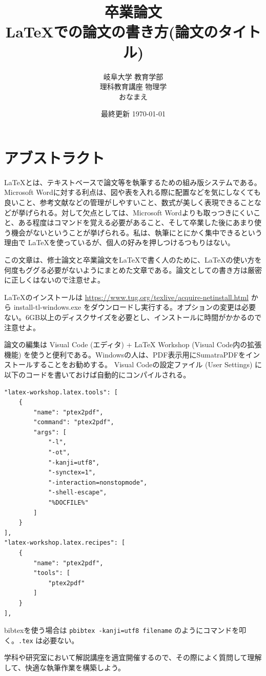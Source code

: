 \documentclass[a4j]{jsarticle}
\title{\vspace{60mm} \LARGE 卒業論文\vspace{10mm}\\LaTeXでの論文の書き方(論文のタイトル)}
\author{\Large 岐阜大学 教育学部 \\ \vspace{5mm}
\Large 理科教育講座 物理学 \\ \vspace{5mm}
\LARGE おなまえ}
\date{最終更新 \today}
\begin{document}
\maketitle
\thispagestyle{empty} %
\newpage %
\tableofcontents %
\newpage %
\section*{アブストラクト}

\LaTeX とは、テキストベースで論文等を執筆するための組み版システムである。Microsoft Wordに対する利点は、図や表を入れる際に配置などを気にしなくても良いこと、参考文献などの管理がしやすいこと、数式が美しく表現できることなどが挙げられる。対して欠点としては、Microsoft Wordよりも取っつきにくいこと、ある程度はコマンドを覚える必要があること、そして卒業した後にあまり使う機会がないということが挙げられる。私は、執筆にとにかく集中できるという理由で \LaTeX を使っているが、個人の好みを押しつけるつもりはない。

この文章は、修士論文と卒業論文を\LaTeX で書く人のために、\LaTeX の使い方を何度もググる必要がないようにまとめた文章である。論文としての書き方は厳密に正しくはないので注意せよ。

\LaTeX のインストールは \url{https://www.tug.org/texlive/acquire-netinstall.html} から install-tl-windows.exe をダウンロードし実行する。オプションの変更は必要ない。6GB以上のディスクサイズを必要とし、インストールに時間がかかるので注意せよ。

論文の編集は Visual Code (エディタ) + LaTeX Workshop (Visual Code内の拡張機能) を使うと便利である。Windowsの人は、PDF表示用にSumatraPDFをインストールすることをお勧めする。
Visual Codeの設定ファイル (User Settings) に以下のコードを書いておけば自動的にコンパイルされる。
\begin{verbatim}
"latex-workshop.latex.tools": [
    {
        "name": "ptex2pdf",
        "command": "ptex2pdf",
        "args": [
            "-l",
            "-ot",
            "-kanji=utf8",
            "-synctex=1",
            "-interaction=nonstopmode",
            "-shell-escape",
            "%DOCFILE%"
        ]
    }
],
"latex-workshop.latex.recipes": [
    {
        "name": "ptex2pdf",
        "tools": [
            "ptex2pdf"
        ]
    }
],
\end{verbatim}

bibtexを使う場合は \verb|pbibtex -kanji=utf8 filename| のようにコマンドを叩く。\verb|.tex| は必要ない。

学科や研究室において解説講座を適宜開催するので、その際によく質問して理解して、快適な執筆作業を構築しよう。
 
\end{document}
